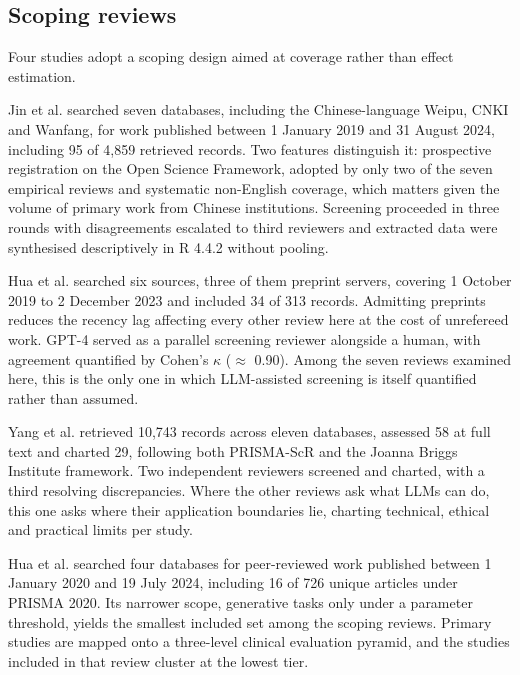 \documentclass[11pt]{article}
\begin{document}
	\subsection{Scoping reviews}
	
	Four studies adopt a scoping design aimed at coverage rather than effect estimation.
	
	Jin et al.\cite{Jin2025LLMMentalHealth} searched seven databases, including the Chinese-language Weipu, CNKI and Wanfang, for work published between 1 January 2019 and 31 August 2024, including 95 of 4,859 retrieved records. Two features distinguish it: prospective registration on the Open Science Framework, adopted by only two of the seven empirical reviews and systematic non-English coverage, which matters given the volume of primary work from Chinese institutions. Screening proceeded in three rounds with disagreements escalated to third reviewers and extracted data were synthesised descriptively in R 4.4.2 without pooling.
	
	Hua et al.\cite{Hua2025LLMMentalHealthScoping} searched six sources, three of them preprint servers, covering 1 October 2019 to 2 December 2023 and included 34 of 313 records. Admitting preprints reduces the recency lag affecting every other review here at the cost of unrefereed work. GPT-4 served as a parallel screening reviewer alongside a human, with agreement quantified by Cohen's $\kappa$ ($\approx$ 0.90). Among the seven reviews examined here, this is the only one in which LLM-assisted screening is itself quantified rather than assumed.
	
	Yang et al.\cite{fpsyg.2025.1715306} retrieved 10,743 records across eleven databases, assessed 58 at full text and charted 29, following both PRISMA-ScR and the Joanna Briggs Institute framework. Two independent reviewers screened and charted, with a third resolving discrepancies. Where the other reviews ask what LLMs can do, this one asks where their application boundaries lie, charting technical, ethical and practical limits per study.
	
	Hua et al.\cite{Hua2025} searched four databases for peer-reviewed work published between 1 January 2020 and 19 July 2024, including 16 of 726 unique articles under PRISMA 2020. Its narrower scope, generative tasks only under a parameter threshold, yields the smallest included set among the scoping reviews. Primary studies are mapped onto a three-level clinical evaluation pyramid, and the studies included in that review cluster at the lowest tier.
	
\end{document}
